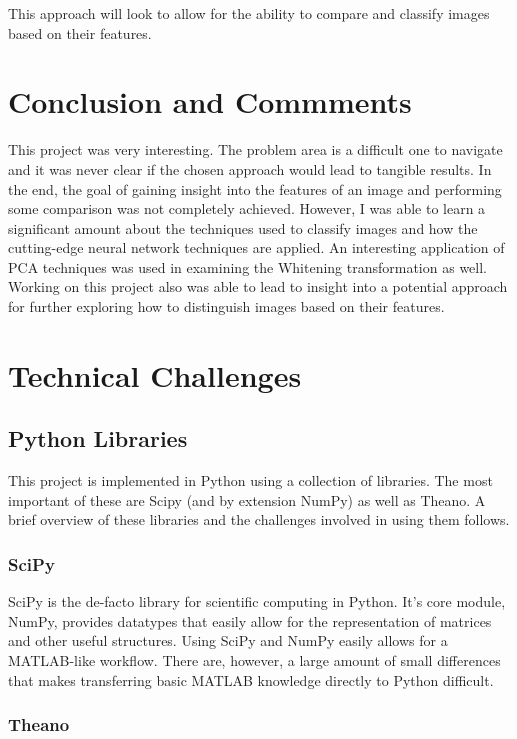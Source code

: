 \documentclass[12pt, titlepage]{article}
\begin{document}
This approach will look to allow for the ability to compare and classify images based on their features.

\section{Conclusion and Commments}

This project was very interesting. The problem area is a difficult one to navigate and it was never clear if the chosen approach would
lead to tangible results. In the end, the goal of gaining insight into the features of an image and performing some comparison was not completely
achieved. However, I was able to learn a significant amount about the techniques used to classify images and how the cutting-edge neural network
techniques are applied. An interesting application of PCA techniques was used in examining the Whitening transformation as well. Working on this
project also was able to lead to insight into a potential approach for further exploring how to distinguish images based on their features.

\section{Technical Challenges}
\subsection{Python Libraries}

This project is implemented in Python using a collection of libraries. The most important of these are Scipy (and
by extension NumPy) as well as Theano. A brief overview of these libraries and the challenges involved in using them
follows. 

  \subsubsection{SciPy}

  SciPy is the de-facto library for scientific computing in Python. It's core module, NumPy, provides datatypes that easily allow for the
  representation of matrices and other useful structures. Using SciPy and NumPy easily allows for a MATLAB-like workflow. There are, however,
  a large amount of small differences that makes transferring basic MATLAB knowledge directly to Python difficult.

  \subsubsection{Theano}
  
\end{document}
